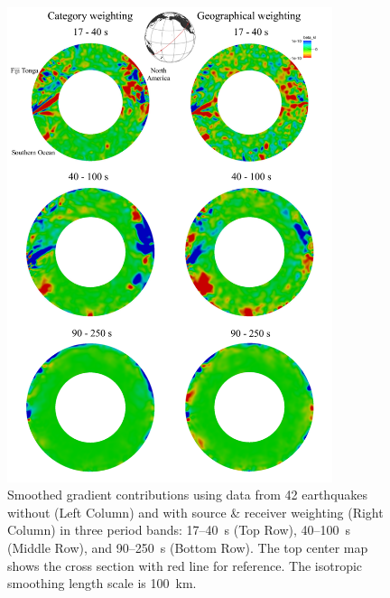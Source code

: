 \begin{figure}
\centering
\includegraphics[width=0.85\textwidth]{ch-weighting/figures/Figure-10-small.pdf}
\caption{\small{Smoothed gradient contributions using data from 42 earthquakes without (Left Column) 
and with source \& receiver weighting (Right Column) in three
period bands: 17--40~s (Top Row), 40--100~s (Middle Row), and 90--250~s (Bottom Row). The top center map shows the cross section with red line for reference.   
The isotropic smoothing length scale is 100~km.
}}
\label{fig:gradient_category}
\end{figure}

